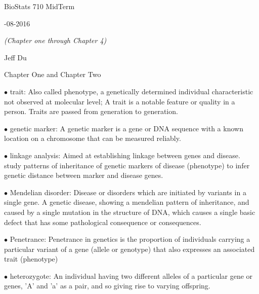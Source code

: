 \documentclass{article}
\begin{document}


\centerline{\sc \large BioStats 710 MidTerm}
\vspace{1pc}
\centerline{-08-2016}
\vspace{1pc}

\centerline{\it (Chapter one through Chapter 4)}

\vspace{1pc}
\centerline{\sc    Jeff Du}
\vspace{2pc}


\centerline{\sc Chapter One and Chapter Two}
\vspace{0.2in}

$\bullet$ trait: 
Also called phenotype, a genetically determined individual characteristic not observed at molecular level; A trait is a notable feature or quality in a person. Traits are passed from generation to generation.


\vspace{0.1in}
$\bullet$ genetic marker: 
A genetic marker is a gene or DNA sequence with a known location on a chromosome that can be measured reliably. 



\vspace{0.1in}
$\bullet$ linkage analysis: 
Aimed at establishing linkage between genes and disease.
study patterns of inheritance of genetic markers of disease (phenotype) to infer genetic distance between marker and disease genes.


\vspace{0.1in}
$\bullet$ Mendelian disorder: 
Disease or disorders which are initiated by variants in a single gene.
A genetic disease, showing a mendelian pattern of inheritance, and caused by a single mutation in the structure of DNA, which causes a single basic defect that has some pathological consequence or consequences.


\vspace{0.1in}
$\bullet$ Penetrance: 
Penetrance in genetics is the proportion of individuals carrying a particular variant of a gene (allele or genotype) that also expresses an associated trait (phenotype)


\vspace{0.1in}
$\bullet$ heterozygote: 
An individual having two different alleles of a particular gene or genes, 'A' and 'a' as a pair, and so giving rise to varying offspring.
\end{document}
